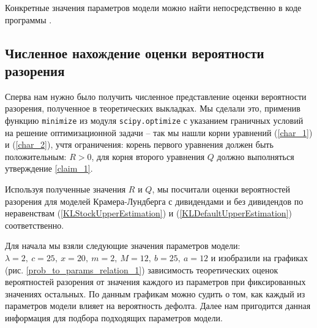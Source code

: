 \documentclass{article}
\theoremstyle{plain}
\theoremstyle{plain}
\theoremstyle{plain}
\theoremstyle{plain}
\theoremstyle{definition}
\theoremstyle{remark}
\begin{document}
Конкретные значения параметров модели можно найти непосредственно в коде программы \cite{model-juyter-notebook}.

\subsection{Численное нахождение оценки вероятности разорения}

Сперва нам нужно было получить численное представление оценки вероятности разорения, полученное в теоретических выкладках. Мы сделали это, применив функцию \texttt{minimize} из модуля \texttt{scipy.optimize} с указанием граничных условий на решение оптимизационной задачи -- так мы нашли корни уравнений (\ref{char_1}) и (\ref{char_2}), учтя ограничения: корень первого уравнения должен быть положительным: $R > 0$, для корня второго уравнения $Q$ должно выполняться утверждение \ref{claim_1}.

Используя полученные значения $R$ и $Q$, мы посчитали оценки вероятностей разорения для моделей Крамера-Лундберга с дивидендами и без дивидендов по неравенствам (\ref{KLStockUpperEstimation}) и (\ref{KLDefaultUpperEstimation}) соответственно.

Для начала мы взяли следующие значения параметров модели: $\lambda = 2,\ c = 25,\ x = 20,\ m = 2,\ M = 12,\ b = 25,\ a = 12$ и изобразили на графиках (рис. \ref{prob_to_params_relation_1}) зависимость теоретических оценок вероятностей разорения от значения каждого из параметров при фиксированных значениях остальных. По данным графикам можно судить о том, как каждый из параметров модели влияет на вероятность дефолта. Далее нам пригодится данная информация для подбора подходящих параметров модели.

\clearpage
\end{document}

